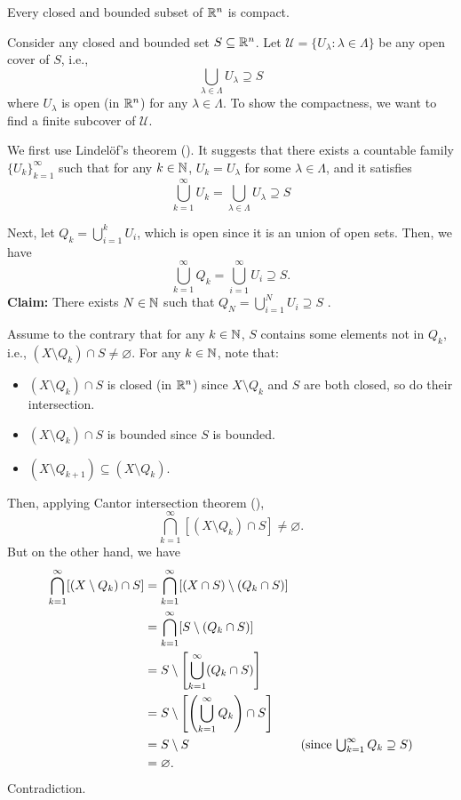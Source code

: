 \begin{enumerate}
\begin{theorem}
\label{thm:heine-borel}
Every closed and bounded subset of \(\mathbb{R}^n\) is compact.
\end{theorem}
\begin{pf}
Consider any closed and bounded set \(S\subseteq \mathbb{R}^n\). Let
\(\mathcal{U}=\{U_{\lambda}:\lambda\in\Lambda\}\) be any open cover of \(S\),
i.e.,
\[
\bigcup_{\lambda\in\Lambda}U_{\lambda}\supseteq S
\]
where \(U_{\lambda}\) is open (in \(\mathbb{R}^n\)) for any \(\lambda\in\Lambda\). To
show the compactness, we want to find a finite subcover of \(\mathcal{U}\).

We first use Lindel\"o{f}'s theorem (). It suggests that
there exists a countable family \(\{U_k\}_{k=1}^{\infty}\) such that for any
\(k\in\mathbb{N}\), \(U_k=U_{\lambda}\) for some \(\lambda\in\Lambda\), and it satisfies
\[
\bigcup_{k=1}^{\infty}U_k=\bigcup_{\lambda\in\Lambda}U_{\lambda}\supseteq S
\]

Next, let \(\displaystyle Q_k=\bigcup_{i=1}^{k}U_i\), which is open since it is
an union of open sets. Then, we have
\[
\bigcup_{k=1}^{\infty}Q_k=\bigcup_{i=1}^{\infty}U_i\supseteq S.
\]
\textbf{Claim:} There exists \(N\in\mathbb{N}\) such that \(\displaystyle
Q_{N}=\bigcup_{i=1}^{N}U_i\supseteq S\) .

\begin{pf}
Assume to the contrary that for any \(k\in\mathbb{N}\), \(S\) contains some elements
not in \(Q_k\), i.e., \((X\setminus Q_{k})\cap S\ne\varnothing\). For any
\(k\in\mathbb{N}\), note that:
\begin{itemize}
\item \((X\setminus Q_k)\cap S\) is closed (in \(\mathbb{R}^n\)) since \(X\setminus
Q_k\) and \(S\) are both closed, so do their intersection.
\item \((X\setminus Q_k)\cap S\) is bounded since \(S\) is bounded.
\item \((X\setminus Q_{k+1})\subseteq (X\setminus Q_k)\).
\end{itemize}
Then, applying Cantor intersection theorem (),
\[
\bigcap_{k=1}^{\infty}[(X\setminus Q_k)\cap S]\ne\varnothing.
\]
But on the other hand, we have
\begin{align*}
\bigcap_{k=1}^{\infty}[(X\setminus Q_k)\cap S]
&=\bigcap_{k=1}^{\infty}[(X\cap S)\setminus (Q_k\cap S)]\\
&=\bigcap_{k=1}^{\infty}[S\setminus (Q_k\cap S)]\\
&=S\setminus \qty[\bigcup_{k=1}^{\infty}(Q_k\cap S)]\\
&=S\setminus \qty[\qty(\bigcup_{k=1}^{\infty}Q_k)\cap S]\\
&=S\setminus S&\text{(since \(\textstyle\bigcup_{k=1}^{\infty}Q_k\supseteq S\))}\\
&=\varnothing.
\end{align*}
Contradiction.
\end{pf}


\end{pf}
\end{enumerate}
